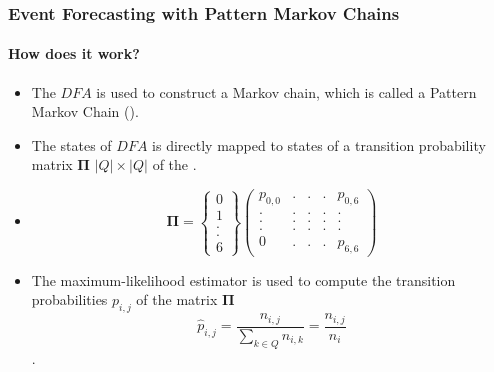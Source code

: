 \frame
{
	\frametitle{Event Forecasting with Pattern Markov
		Chains}
	\framesubtitle{How does it work?}
	\begin{itemize}
		\item<only@1> The $DFA$ is used to construct a Markov chain, which is called a Pattern Markov Chain (\pmcmr).
		
		
	    \item<only@1> The states of $DFA$ is directly mapped to states of a transition probability matrix $\boldsymbol{\Pi}$  $\lvert Q \rvert \times \lvert Q \rvert$ of the \pmcmr.
		
		\item<only@1> 
	\begin{equation*}
	\label{eq:matrix_example}
	\boldsymbol{\Pi} = 
	\begin{Bmatrix} 
	0 \\ 1 \\ . \\ . \\6
	\end{Bmatrix}
	\begin{pmatrix} 
	p_{0,0}	    &. 		&. 		& . &  	p_{0,6} \\
    . 		    & .		& .	& .	& . \\
	.		    & .		& .		& .	& . \\
	.			& .		& .		& .	& .\\
	0			& .			& .		& .	&p_{6,6}
	\end{pmatrix}
	\end{equation*}
	
	\item<only@1> The maximum-likelihood estimator is used to compute the transition probabilities $p_{i,j}$ of the matrix $\boldsymbol{\Pi}$ 
	\begin{equation}
	\label{eq:pi_estim}
	\hat{p}_{i,j}=\frac{n_{i,j}}{\sum_{k \in Q} n_{i,k}}=\frac{n_{i,j}}{n_{i}}
	\end{equation}. 	
		
	\end{itemize}
}



